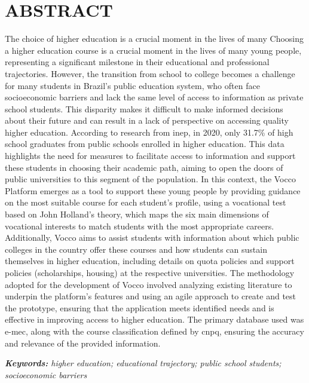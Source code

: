 \chapter*{ABSTRACT}
The choice of higher education is a crucial moment in the lives of many Choosing a higher education course is a crucial moment in the lives of many young people, representing a significant milestone in their educational and professional trajectories. However, the transition from school to college becomes a challenge for many students in Brazil’s public education system, who often face socioeconomic barriers and lack the same level of access to information as private school students. This disparity makes it difficult to make informed decisions about their future and can result in a lack of perspective on accessing quality higher education. According to research from \ac{inep}, in 2020, only 31.7\% of high school graduates from public schools enrolled in higher education. This data highlights the need for measures to facilitate access to information and support these students in choosing their academic path, aiming to open the doors of public universities to this segment of the population. In this context, the Vocco Platform emerges as a tool to support these young people by providing guidance on the most suitable course for each student's profile, using a vocational test based on John Holland’s theory, which maps the six main dimensions of vocational interests to match students with the most appropriate careers. Additionally, Vocco aims to assist students with information about which public colleges in the country offer these courses and how students can sustain themselves in higher education, including details on quota policies and support policies (scholarships, housing) at the respective universities. The methodology adopted for the development of Vocco involved analyzing existing literature to underpin the platform's features and using an agile approach to create and test the prototype, ensuring that the application meets identified needs and is effective in improving access to higher education. The primary database used was \ac{e-mec}, along with the course classification defined by \ac{cnpq}, ensuring the accuracy and relevance of the provided information.

\vspace{3\baselineskip}
\textit{\textbf{Keywords:} higher education; educational trajectory; public school students; socioeconomic barriers}